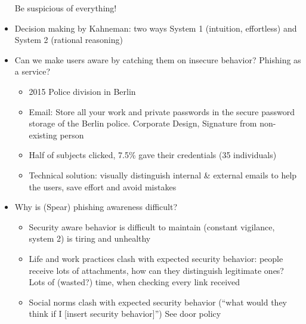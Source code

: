 \documentclass[a4paper,12pt]{scrartcl}
\begin{document}
\begin{itemize}
		Be suspicious of everything!
	\item
		Decision making by Kahneman: two ways System 1 (intuition, effortless) and System 2 (rational reasoning)
	\item
		Can we make users aware by catching them on insecure behavior? Phishing as a service?
		\begin{itemize}
			\item
				2015 Police division in Berlin
			\item
				Email: Store all your work and private passwords in the secure password storage of the Berlin police. Corporate Design, Signature from non-existing person
			\item
				Half of subjects clicked, 7.5\% gave their credentials (35 individuals)
			\item
				Technical solution: visually distinguish internal \& external emails to help the users, save effort and avoid mistakes
		\end{itemize}
	\item
		Why is (Spear) phishing awareness difficult?
		\begin{itemize}
			\item
				Security aware behavior is difficult to maintain (constant vigilance, system 2) is tiring and unhealthy
			\item
				Life and work practices clash with expected security behavior: people receive lots of attachments, how can they distinguish legitimate ones? Lots of (wasted?) time, when checking every link received
			\item
				Social norms clash with expected security behavior (\enquote{what would they think if I [insert security behavior]}) See door policy
				

\end{itemize}
\end{itemize}
\end{document}
